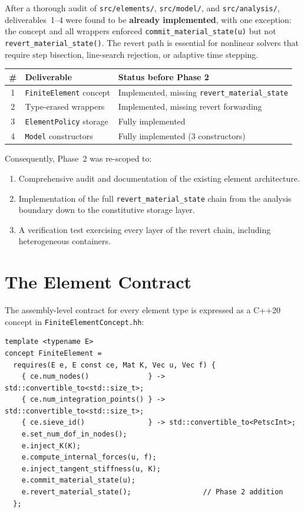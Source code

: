 After a thorough audit of \texttt{src/elements/}, \texttt{src/model/},
and \texttt{src/analysis/}, deliverables~1--4 were found to be
\textbf{already implemented}, with one exception: the concept and all
wrappers enforced \texttt{commit\_material\_state(u)} but not
\texttt{revert\_material\_state()}.  The revert path is essential for
nonlinear solvers that require step bisection, line-search rejection,
or adaptive time stepping.

\begin{center}
\begin{tabular}{cll}
\toprule
\textbf{\#} & \textbf{Deliverable} & \textbf{Status before Phase 2} \\
\midrule
1 & \texttt{FiniteElement} concept &
    Implemented, missing \texttt{revert\_material\_state} \\
2 & Type-erased wrappers &
    Implemented, missing revert forwarding \\
3 & \texttt{ElementPolicy} storage &
    Fully implemented \\
4 & \texttt{Model} constructors &
    Fully implemented (3 constructors) \\
\bottomrule
\end{tabular}
\end{center}

Consequently, Phase~2 was re-scoped to:
\begin{enumerate}[label=(\alph*)]
  \item Comprehensive audit and documentation of the existing element
        architecture.
  \item Implementation of the full \texttt{revert\_material\_state}
        chain from the analysis boundary down to the constitutive
        storage layer.
  \item A verification test exercising every layer of the revert
        chain, including heterogeneous containers.
\end{enumerate}

\section{The Element Contract}
\label{sec:finite-element-concept}

The assembly-level contract for every element type is expressed as a
C++20 concept in \texttt{FiniteElementConcept.hh}:

\begin{lstlisting}[caption={The \texttt{FiniteElement} concept},
                   label={lst:finite-element-concept}]
template <typename E>
concept FiniteElement =
  requires(E e, E const ce, Mat K, Vec u, Vec f) {
    { ce.num_nodes()              } -> std::convertible_to<std::size_t>;
    { ce.num_integration_points() } -> std::convertible_to<std::size_t>;
    { ce.sieve_id()               } -> std::convertible_to<PetscInt>;
    e.set_num_dof_in_nodes();
    e.inject_K(K);
    e.compute_internal_forces(u, f);
    e.inject_tangent_stiffness(u, K);
    e.commit_material_state(u);
    e.revert_material_state();                 // Phase 2 addition
  };
\end{lstlisting}

